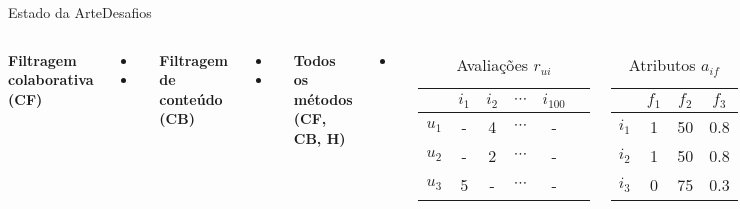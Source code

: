 \begin{frame}{Estado da Arte}{Desafios}
\begin{columns}[c]
\textbf{Filtragem colaborativa (CF)}
\begin{itemize}
    \item {}
    \item {}
\end{itemize}

\textbf{Filtragem de conteúdo (CB)}

\begin{itemize}
    \item {}
    \item {}
\end{itemize}

\textbf{Todos os métodos (CF, CB, H)}

\begin{itemize}
    \item {}
\end{itemize}


\begin{table}[h]
\begin{center}
    \caption{Avaliações $r_{ui}$}\vspace{-0.4cm}
    \begin{tabular}{ | c | c | c | c | c | c |} 
    \hline
     & $i_1$ & $i_2$ & $\cdots$ & $i_{100}$ \\ \hline
     $u_1$ & - & 4 & $\cdots$ & - \\ \hline
     $u_2$ & - & 2 & $\cdots$ & - \\ \hline
     $u_3$ & 5 & - & $\cdots$ & - \\ \hline
    \end{tabular}
\end{center}
\end{table}

\vspace{-.5cm}

\begin{table}[h]
\begin{center}
    \caption{Atributos $a_{if}$}
    \begin{tabular}{ | c | c | c | c | } 
    \hline
     & $f_1$ & $f_2$ & $f_3$ \\ \hline
     $i_1$ & 1 & 50 & 0.8 \\ \hline
     $i_2$ & 1 & 50 & 0.8 \\ \hline
     $i_3$ & 0 & 75 & 0.3 \\ \hline
    \end{tabular}
\end{center}
\end{table}

\end{columns}
\end{frame}

